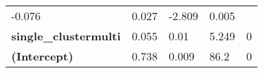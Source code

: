 \documentclass[]{article}
\begin{document}
\begin{longtable}[c]{@{}lllll@{}}
\begin{minipage}[t]{0.13\columnwidth}\raggedright\strut
-0.076
\strut\end{minipage} &
\begin{minipage}[t]{0.16\columnwidth}\raggedright\strut
0.027
\strut\end{minipage} &
\begin{minipage}[t]{0.12\columnwidth}\raggedright\strut
-2.809
\strut\end{minipage} &
\begin{minipage}[t]{0.12\columnwidth}\raggedright\strut
0.005
\strut\end{minipage}\tabularnewline
\begin{minipage}[t]{0.31\columnwidth}\raggedright\strut
\textbf{single\_clustermulti}
\strut\end{minipage} &
\begin{minipage}[t]{0.13\columnwidth}\raggedright\strut
0.055
\strut\end{minipage} &
\begin{minipage}[t]{0.16\columnwidth}\raggedright\strut
0.01
\strut\end{minipage} &
\begin{minipage}[t]{0.12\columnwidth}\raggedright\strut
5.249
\strut\end{minipage} &
\begin{minipage}[t]{0.12\columnwidth}\raggedright\strut
0
\strut\end{minipage}\tabularnewline
\begin{minipage}[t]{0.31\columnwidth}\raggedright\strut
\textbf{(Intercept)}
\strut\end{minipage} &
\begin{minipage}[t]{0.13\columnwidth}\raggedright\strut
0.738
\strut\end{minipage} &
\begin{minipage}[t]{0.16\columnwidth}\raggedright\strut
0.009
\strut\end{minipage} &
\begin{minipage}[t]{0.12\columnwidth}\raggedright\strut
86.2
\strut\end{minipage} &
\begin{minipage}[t]{0.12\columnwidth}\raggedright\strut
0
\strut\end{minipage}\tabularnewline
\bottomrule
\end{longtable}
\end{document}
